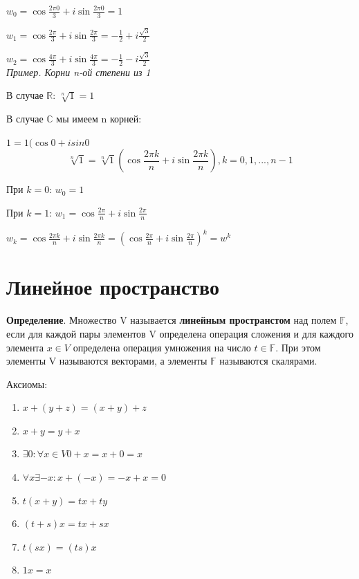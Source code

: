 \documentclass[a4paper]{article}
\begin{document}
$\displaystyle w_0 = \cos \frac{2 \pi 0}{3} + i \sin \frac{2 \pi 0}{3} = 1$

$\displaystyle w_1 = \cos \frac{2 \pi}{3} + i \sin \frac{2 \pi}{3} = -\frac{1}{2} + i\frac{\sqrt{3}}{2}$

$\displaystyle w_2 = \cos \frac{4 \pi}{3} + i \sin \frac{4 \pi}{3} = -\frac{1}{2} - i\frac{\sqrt{3}}{2}$\\

\textit{Пример. Корни n-ой степени из 1}

В случае $\mathbb{R}$: $\sqrt[n]{1} = 1$

В случае $\mathbb{C}$ мы имеем n корней:

$1 = 1(\cos 0 + i sin 0$
\begin{equation}
\displaystyle \sqrt[n]{1} = \sqrt[n]{1} \left( \cos \frac{2\pi k}{n} + i \sin \frac{2 \pi k}{n} \right), k=0,1,...,n-1
\end{equation}


При $k=0$: $w_0 = 1$

При $k=1$: $\displaystyle w_1 = \cos \frac{2\pi}{n} + i \sin \frac{2\pi}{n}$

$\displaystyle w_k = \cos \frac{2\pi k}{n} + i \sin \frac{2 \pi k}{n} = \left( \cos \frac{2\pi}{n} + i \sin \frac{2 \pi}{n} \right)^k = w^k$



\section*{Линейное пространство}
\textbf{Определение}. Множество V называется \textbf{линейным пространстом} над полем $\mathbb{F}$, если для каждой пары элементов V определена операция сложения и для каждого элемента $x \in V$ определена операция умножения на число $t \in \mathbb{F}$. При этом элементы V называются векторами, а элементы $\mathbb{F}$ называются скалярами.

Аксиомы:
\begin{enumerate}
\item $x+(y+z) = (x+y)+z$
\item $x+y=y+x$
\item $\exists 0: \forall x \in V 0 + x = x + 0 = x$
\item $\forall x \exists -x: x + (-x) = -x + x = 0$
\item $t(x+y) = tx + ty$
\item $(t+s)x = tx + sx$
\item $t(sx) = (ts)x$
\item $1x = x$
\end{enumerate}
\end{document}
